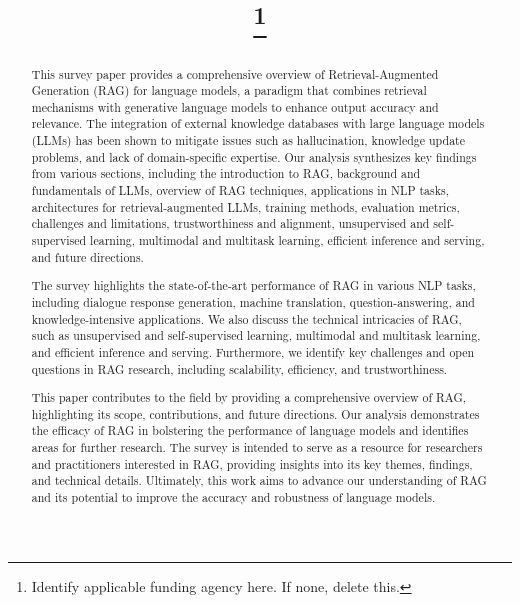 \documentclass[conference]{IEEEtran}
\begin{document}
\title{
\thanks{Identify applicable funding agency here. If none, delete this.}
}

\author{
\and
{}
}

\maketitle

\begin{abstract}
This survey paper provides a comprehensive overview of Retrieval-Augmented Generation (RAG) for language models, a paradigm that combines retrieval mechanisms with generative language models to enhance output accuracy and relevance. The integration of external knowledge databases with large language models (LLMs) has been shown to mitigate issues such as hallucination, knowledge update problems, and lack of domain-specific expertise. Our analysis synthesizes key findings from various sections, including the introduction to RAG, background and fundamentals of LLMs, overview of RAG techniques, applications in NLP tasks, architectures for retrieval-augmented LLMs, training methods, evaluation metrics, challenges and limitations, trustworthiness and alignment, unsupervised and self-supervised learning, multimodal and multitask learning, efficient inference and serving, and future directions.

The survey highlights the state-of-the-art performance of RAG in various NLP tasks, including dialogue response generation, machine translation, question-answering, and knowledge-intensive applications. We also discuss the technical intricacies of RAG, such as unsupervised and self-supervised learning, multimodal and multitask learning, and efficient inference and serving. Furthermore, we identify key challenges and open questions in RAG research, including scalability, efficiency, and trustworthiness.

This paper contributes to the field by providing a comprehensive overview of RAG, highlighting its scope, contributions, and future directions. Our analysis demonstrates the efficacy of RAG in bolstering the performance of language models and identifies areas for further research. The survey is intended to serve as a resource for researchers and practitioners interested in RAG, providing insights into its key themes, findings, and technical details. Ultimately, this work aims to advance our understanding of RAG and its potential to improve the accuracy and robustness of language models.
\end{abstract}
\end{document}
